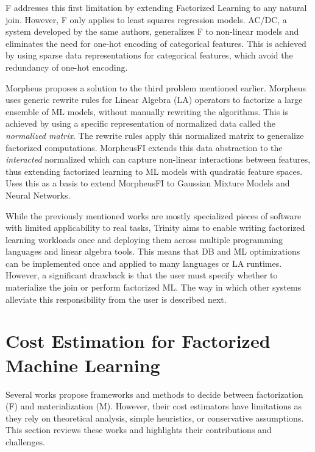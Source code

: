 F \cite{f_schleich} addresses this first limitation by extending Factorized Learning to any natural join. However, F only applies to least squares regression models. AC/DC, a system developed by the same authors, generalizes F to non-linear models and eliminates the need for one-hot encoding of categorical features. This is achieved by using sparse data representations for categorical features, which avoid the redundancy of one-hot encoding.

Morpheus \cite{morpheus} proposes a solution to the third problem mentioned earlier. Morpheus uses generic rewrite rules for Linear Algebra (LA) operators to factorize a large ensemble of ML models, without manually rewriting the algorithms. This is achieved by using a specific representation of normalized data called the \textit{normalized matrix}. The rewrite rules apply this normalized matrix to generalize factorized computations. MorpheusFI \cite{MorpheusFI} extends this data abstraction to the \textit{interacted} normalized which can capture non-linear interactions between features, thus extending factorized learning to ML models with quadratic feature spaces. \cite{f_gmm_DBLP:conf/icde/ChengKZ021} Uses this as a basis to extend MorpheusFI to Gaussian Mixture Models and Neural Networks.

While the previously mentioned works are mostly specialized pieces of software with limited applicability to real tasks, Trinity \cite{TrinityPolyglotFrameworkFactorized2021} aims to enable writing factorized learning workloads once and deploying them across multiple programming languages and linear algebra tools. This means that DB and ML optimizations can be implemented once and applied to many languages or LA runtimes. However, a significant drawback is that the user must specify whether to materialize the join or perform factorized ML. The way in which other systems alleviate this responsibility from the user is described next.

\section{Cost Estimation for Factorized Machine Learning}
\label{sec:3-cost-estimation-for-factorized-ml}
Several works propose frameworks and methods to decide between factorization (F) and materialization (M). However, their cost estimators have limitations as they rely on theoretical analysis, simple heuristics, or conservative assumptions. This section reviews these works and highlights their contributions and challenges.

